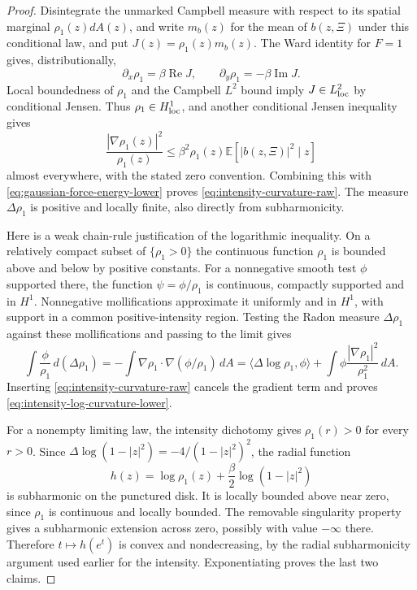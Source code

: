 \documentclass[11pt,a4paper]{article}
\numberwithin{equation}{section}
\theoremstyle{definition}
\theoremstyle{remark}
\newcommand{\E}{\mathbb E}
\begin{document}
\begin{proof}
Disintegrate the unmarked Campbell measure with respect to its spatial
marginal $\rho_1(z)dA(z)$, and write $m_b(z)$ for the mean of
$b(z,\Xi)$ under this conditional law, and put $J(z)=\rho_1(z)m_b(z)$.
The Ward identity for $F=1$ gives, distributionally,
\[
 \partial_x\rho_1=\beta\operatorname{Re}J,
 \qquad \partial_y\rho_1=-\beta\operatorname{Im}J.
\]
Local boundedness of $\rho_1$ and the Campbell $L^2$ bound imply
$J\in L^2_{\rm loc}$ by conditional Jensen. Thus
$\rho_1\in H^1_{\rm loc}$, and another conditional Jensen inequality
gives
\[
 \frac{|\nabla\rho_1(z)|^2}{\rho_1(z)}
 \le\beta^2\rho_1(z)\E[|b(z,\Xi)|^2\mid z]
\]
almost everywhere, with the stated zero convention. Combining this
with \eqref{eq:gaussian-force-energy-lower} proves
\eqref{eq:intensity-curvature-raw}. The measure $\Delta\rho_1$ is
positive and locally finite, also directly from subharmonicity.

Here is a weak chain-rule justification of the logarithmic inequality.
On a relatively compact subset of $\{\rho_1>0\}$ the continuous
function $\rho_1$ is bounded above and below by positive constants.
For a nonnegative smooth test $\phi$ supported there, the function
$\psi=\phi/\rho_1$ is continuous, compactly supported and in $H^1$.
Nonnegative mollifications approximate it uniformly and in $H^1$,
with support in a common positive-intensity region. Testing the Radon
measure $\Delta\rho_1$ against these mollifications and passing to
the limit gives
\[
 \int\frac\phi{\rho_1}\,d(\Delta\rho_1)
 =-\int\nabla\rho_1\cdot\nabla(\phi/\rho_1)\,dA
 =\langle\Delta\log\rho_1,\phi\rangle
                  +\int\phi\frac{|\nabla\rho_1|^2}{\rho_1^2}\,dA.
\]
Inserting \eqref{eq:intensity-curvature-raw} cancels the gradient term
and proves \eqref{eq:intensity-log-curvature-lower}.

For a nonempty limiting law, the intensity dichotomy gives
$\rho_1(r)>0$ for every $r>0$. Since
$\Delta\log(1-|z|^2)=-4/(1-|z|^2)^2$, the radial function
\[
 h(z)=\log\rho_1(z)+\frac\beta2\log(1-|z|^2)
\]
is subharmonic on the punctured disk. It is locally bounded above near
zero, since $\rho_1$ is continuous and locally bounded. The removable
singularity property gives a subharmonic extension across zero,
possibly with value $-\infty$ there. Therefore $t\mapsto h(e^t)$ is
convex and nondecreasing, by the radial subharmonicity argument used
earlier for the intensity. Exponentiating proves the last two claims.
\end{proof}
\end{document}

